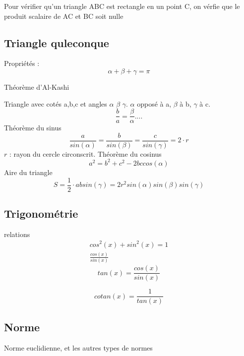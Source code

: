 \documentclass[12pt,a4paper,twoside]{article}
\numberwithin{equation}{subsection}
\begin{document}
Pour vérifier qu'un triangle ABC est rectangle en un point C, on vérfie que le produit scalaire de AC et BC soit nulle


\subsection{Triangle quleconque}
Propriétés : \\



\begin{equation}
\alpha+\beta+\gamma=\pi
\end{equation}

Théorème d'Al-Kashi



Triangle avec cotés a,b,c et angles $\alpha$ $\beta$ $\gamma$. $\alpha$ opposé à a, $\beta$ à b, $\gamma$ à c. 
\begin{equation}
\frac{b}{a}=\frac{\beta}{\alpha}....
\end{equation}
Théorème du sinus
\begin{equation}
\frac{a}{sin(\alpha)}=\frac{b}{sin(\beta)}=\frac{c}{sin(\gamma)}=2\cdot r
\end{equation}
$r$ : rayon du cercle circonscrit. 
Théorème du cosinus
\begin{equation}
a^2=b^2+c^2 - 2 b c cos(\alpha)
\end{equation}
Aire du triangle
\begin{equation}
S=\frac{1}{2}\cdot a b sin(\gamma)=2r^2sin(\alpha)sin(\beta)sin(\gamma)
\end{equation}
\subsection{Trigonométrie}
relations
\begin{eqnarray}
cos^2(x)+sin^2(x)=1\\
\frac{cos(x)}{sin(x)}
\end{eqnarray}
\begin{equation}
tan(x)=\frac{cos(x)}{sin(x)}
\end{equation}

\begin{equation}
cotan(x)=\frac{1}{tan(x)}
\end{equation}

\subsection{Norme}
Norme euclidienne, et les autres types de normes
\end{document}
